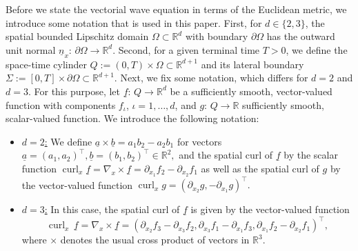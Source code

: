 \documentclass[a4paper,11pt]{article}
\newcommand{\R}{\mathbb R}
\newcommand{\cu}{\operatorname{curl}}
\renewcommand{\vec}[1]{\underline{#1}}
\begin{document}
    
	Before we state the vectorial wave equation in terms of the Euclidean metric, we introduce some notation that is used in this paper. First, for $d \in \{2,3\}$, the spatial bounded Lipschitz domain $\Omega \subset \R^d$ with boundary $\partial \Omega$ has the outward unit normal $\vec n_x \colon \, \partial \Omega \to \R^d$. Second, for a given terminal time $T>0$, we define the space-time cylinder $Q:=(0,T) \times \Omega \subset \R^{d+1}$ and its lateral boundary $\Sigma := [0,T]\times\partial\Omega \subset \R^{d+1}$. Next, we fix some notation, which differs for $d=2$ and $d=3.$ For this purpose, let $\vec f \colon \, Q \to \R^d$ be a sufficiently smooth, vector-valued function with components $f_\iota$, $\iota=1,\dots,d$, and $g \colon \, Q \to \R$ sufficiently smooth, scalar-valued function. We introduce the following notation:
	\begin{itemize}
	 \item \underline{$d=2$:} We define $\vec a \times \vec b = a_1 b_2 - a_2 b_1$ for vectors $\vec a = (a_1, a_2)^\top, \vec b=(b_1,b_2)^\top \in \R^2,$ and the spatial curl of $\vec f$ by the scalar function $\cu_x \vec f = \nabla_x \times \vec f = \partial_{x_1} f_2 - \partial_{x_2} f_1$ as well as the spatial curl of $g$ by the vector-valued function $\cu_x g=(\partial_{x_2} g, - \partial_{x_1} g)^\top.$
	 \item \underline{$d=3$:} In this case, the spatial curl of $\vec f$ is given by the vector-valued function
	\begin{equation*}
            \cu_x \, \vec f = \nabla_x \times \vec f = \left( \partial_{x_2} f_3 - \partial_{x_3} f_2, \partial_{x_3} f_1 - \partial_{x_1} f_3, \partial_{x_1} f_2 - \partial_{x_2} f_1 \right)^\top,
	\end{equation*}
	where $\times$ denotes the usual cross product of vectors in $\R^3.$
	\end{itemize}
    
\end{document}
